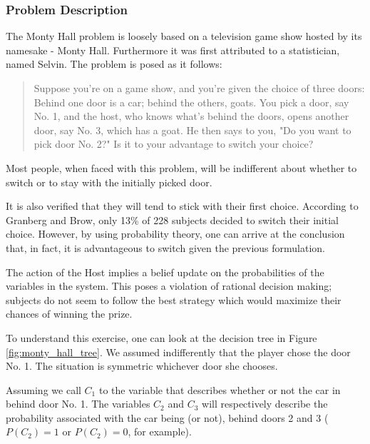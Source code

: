 \subsubsection{Problem Description}
\label{subsubsec:monty_hall_problem description}

The Monty Hall problem is loosely based on a television game show hosted by its namesake - Monty Hall. Furthermore it was first attributed to a statistician, named Selvin. The problem is posed as it follows:
\begin{quotation}
Suppose you're on a game show, and you're given the choice of three doors: Behind one door is a car; behind the others, goats. You pick a door, say No. 1, and the host, who knows what's behind the doors, opens another door, say No. 3, which has a goat. He then says to you, "Do you want to pick door No. 2?" Is it to your advantage to switch your choice?
\end{quotation}

Most people, when faced with this problem, will be indifferent about whether to switch or to stay with the initially picked door.
 
It is also verified that they will tend to stick with their first choice. According to Granberg and Brow\cite{Granberg1995}, only 13\% of 228 subjects decided to switch their initial choice. However, by using probability theory, one can arrive at the conclusion that, in fact, it is advantageous to switch given the previous formulation.
 
The action of the Host implies a belief update on the probabilities of the variables in the system. This poses a violation of rational decision making; subjects do not seem to follow the best strategy which would maximize their chances of winning the prize. 

To understand this exercise, one can look at the decision tree in Figure \ref{fig:monty_hall_tree}. We assumed indifferently that the player chose the door No. 1. The situation is symmetric whichever door she chooses. 


Assuming we call $C_{1}$ to the variable that describes whether or not the car in behind door No. 1. The variables $C_{2}$ and $C_{3}$ will respectively describe the probability associated with the car being (or not), behind doors 2 and 3 ($P(C_{2})=1$ or $P(C_{2})=0$, for example).

